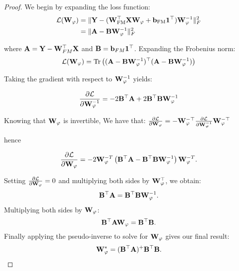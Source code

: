 \begin{proof}

We begin by expanding the loss function:
\begin{align*}
    \mathcal{L} (\mathbf{W}_{\varphi}) &= \|\mathbf{Y} - (\mathbf{W}_{\text{FM}}^\top \mathbf{X} \mathbf{W}_{\varphi} + {\bf b}_{\text{FM}} \mathbf{1}^\top) \mathbf{W}_{\varphi}^{-1} \|_F^2 \\
    &= \| \mathbf{A} - {\bf B} \mathbf{W}_{\varphi}^{-1} \|_F^2
\end{align*}

where $\mathbf{A} = \mathbf{Y} -  \mathbf{W}_{FM}^\top \mathbf{X}$ and ${\bf B} = {\bf b}_{FM} \mathbf{1}^\top$. Expanding the Frobenius norm:
\begin{equation*}
    \mathcal{L} (\mathbf{W}_{\varphi}) = \text{Tr} \left( (\mathbf{A} - {\bf B} \mathbf{W}_{\varphi}^{-1})^\top (\mathbf{A} - {\bf B} \mathbf{W}_{\varphi}^{-1}) \right)
\end{equation*}

Taking the gradient with respect to $\mathbf{W}_{\varphi}^{-1}$ yields:

\begin{equation*}
    \frac{\partial \mathcal{L}}{\partial \mathbf{W}_{\varphi}^{-1}} = - 2 {\bf B}^\top \mathbf{A} + 2 {\bf B}^\top {\bf B} \mathbf{W}_{\varphi}^{-1}
\end{equation*}

Knowing that $\mathbf{W}_{\varphi}$ is invertible, We have that: $ \frac{\partial \mathcal{L}}{\partial \mathbf{W}_{\varphi}} =  - \mathbf{W}_{\varphi}^{-\top} \frac{\partial \mathcal{L}}{\partial \mathbf{W}_{\varphi}^{-1}} \mathbf{W}_{\varphi}^{-\top}$

hence

\begin{equation*}
    \frac{\partial \mathcal{L}}{\partial \mathbf{W}_{\varphi}} = -2 \mathbf{W}_{\varphi}^{-T} \left( {\bf B}^\top \mathbf{A} - {\bf B}^\top {\bf B} \mathbf{W}_{\varphi}^{-1} \right) \mathbf{W}_{\varphi}^{-T}.
\end{equation*}

Setting $\frac{\partial \mathcal{L}}{\partial \mathbf{W}_{\varphi}} = 0$ and multiplying both sides by $\mathbf{W}_{\varphi}^\top$, we obtain:
\begin{equation*}
    {\bf B}^\top \mathbf{A} = {\bf B}^\top {\bf B} \mathbf{W}_{\varphi}^{-1}.
\end{equation*}
Multiplying both sides by $\mathbf{W}_{\varphi}$:
\begin{equation*}
     {\bf B}^\top \mathbf{A} \mathbf{W}_{\varphi} = {\bf B}^\top {\bf B}.
\end{equation*}
Finally applying the pseudo-inverse to solve for $\mathbf{W}_{\varphi}$ gives our final result:
\begin{equation*}
    \mathbf{W}_{\varphi}^* = ({\bf B}^\top \mathbf{A})^{+} {\bf B}^\top {\bf B}.
\end{equation*}


\end{proof}
